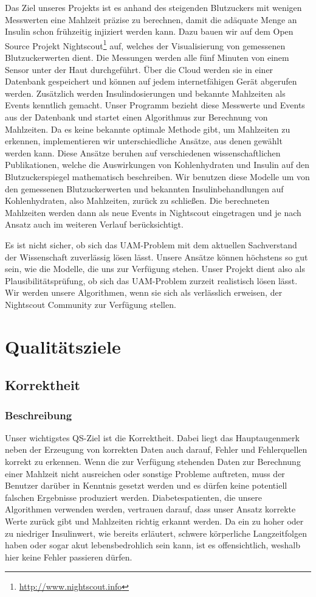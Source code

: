 \documentclass[accentcolor=tud0b,12pt,paper=a4]{tudreport}
\begin{document}
Das Ziel unseres Projekts ist es anhand des steigenden Blutzuckers mit wenigen Messwerten eine Mahlzeit präzise zu berechnen, damit die adäquate Menge an Insulin schon frühzeitig injiziert werden kann. Dazu bauen wir auf dem Open Source Projekt Nightscout\footnote{\url{http://www.nightscout.info}} auf, welches der Visualisierung von gemessenen Blutzuckerwerten dient. Die Messungen werden alle fünf Minuten von einem Sensor unter der Haut durchgeführt. Über die Cloud werden sie in einer Datenbank gespeichert und können auf jedem internetfähigen Gerät abgerufen werden. Zusätzlich werden Insulindosierungen und bekannte Mahlzeiten als Events kenntlich gemacht. Unser Programm bezieht diese Messwerte und Events aus der Datenbank und startet einen Algorithmus zur Berechnung von Mahlzeiten. Da es keine bekannte optimale Methode gibt, um Mahlzeiten zu erkennen, implementieren wir unterschiedliche Ansätze, aus denen gewählt werden kann. Diese Ansätze beruhen auf verschiedenen wissenschaftlichen Publikationen, welche die Auswirkungen von Kohlenhydraten und Insulin auf den Blutzuckerspiegel mathematisch beschreiben. Wir benutzen diese Modelle um von den gemessenen Blutzuckerwerten und bekannten Insulinbehandlungen auf Kohlenhydraten, also Mahlzeiten, zurück zu schließen. Die berechneten Mahlzeiten werden dann als neue Events in Nightscout eingetragen und je nach Ansatz auch im weiteren Verlauf berücksichtigt.

Es ist nicht sicher, ob sich das UAM-Problem mit dem aktuellen Sachverstand der Wissenschaft zuverlässig lösen lässt. Unsere Ansätze können höchstens so gut sein, wie die Modelle, die uns zur Verfügung stehen. Unser Projekt dient also als Plausibilitätsprüfung, ob sich das UAM-Problem zurzeit realistisch lösen lässt. Wir werden unsere Algorithmen, wenn sie sich als verlässlich erweisen, der Nightscout Community zur Verfügung stellen.


	\chapter{Qualitätsziele}
    \section{Korrektheit}
    
	\subsection{Beschreibung}
Unser wichtigstes QS-Ziel ist die Korrektheit. Dabei liegt das Hauptaugenmerk neben der Erzeugung von korrekten Daten auch darauf, Fehler und Fehlerquellen korrekt zu erkennen. Wenn die zur Verfügung stehenden Daten zur Berechnung einer Mahlzeit nicht ausreichen oder sonstige Probleme auftreten, muss der Benutzer darüber in Kenntnis gesetzt werden und es dürfen keine potentiell falschen Ergebnisse produziert werden. Diabetespatienten, die unsere Algorithmen verwenden werden, vertrauen darauf, dass unser Ansatz korrekte Werte zurück gibt und Mahlzeiten richtig erkannt werden. Da ein zu hoher oder zu niedriger Insulinwert, wie bereits erläutert, schwere körperliche Langzeitfolgen haben oder sogar akut lebensbedrohlich sein kann, ist es offensichtlich, weshalb hier keine Fehler passieren dürfen.
\end{document}
